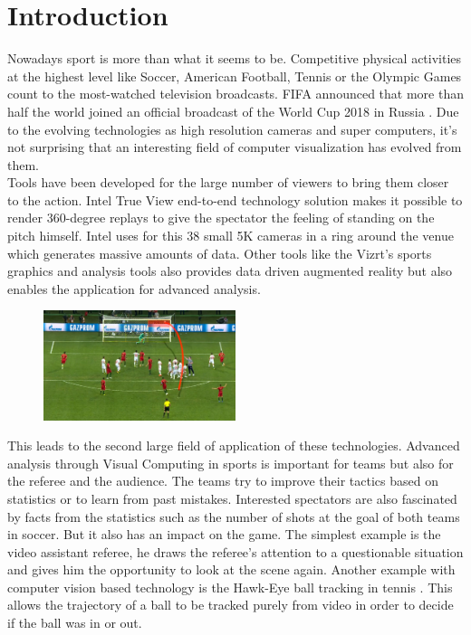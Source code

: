 \chapter{Introduction}
Nowadays sport is more than what it seems to be. Competitive physical activities at the highest level like Soccer, American Football, Tennis or the Olympic Games count to the most-watched television broadcasts. FIFA announced that more than half the world joined an official broadcast of the World Cup 2018 in Russia \cite{worldcup}. Due to the evolving technologies as high resolution cameras and super computers, it's not surprising that an interesting field of computer visualization has evolved from them. \\ 
Tools have been developed for the large number of viewers to bring them closer to the action. Intel True View end-to-end technology solution \cite{intel} makes it possible to render 360-degree replays to give the spectator the feeling of standing on the pitch himself. Intel uses for this 38 small 5K cameras in a ring around the venue which generates massive amounts of data. Other tools like the Vizrt's sports graphics and analysis tools \cite{vizrt} also provides data driven augmented reality but also enables the application for advanced analysis. 

\begin{figure}[h]
	\centering
	\includegraphics[width=0.5\textwidth]{./images/freekick.jpg}
	\label{fig:freekick}
\end{figure}
This leads to the second large field of application of these technologies. Advanced analysis through Visual Computing in sports is important for teams but also for the referee and the audience. The teams try to improve their tactics based on statistics or to learn from past mistakes. Interested spectators are also fascinated by facts from the statistics such as the number of shots at the goal of both teams in soccer. But it also has an impact on the game. The simplest example is the video assistant referee, he draws the referee's attention to a questionable situation and gives him the opportunity to look at the scene again. Another example with computer vision based technology is the Hawk-Eye ball tracking in tennis \cite{hawk}. This allows the trajectory of a ball to be tracked purely from video in order to decide if the ball was in or out. 


